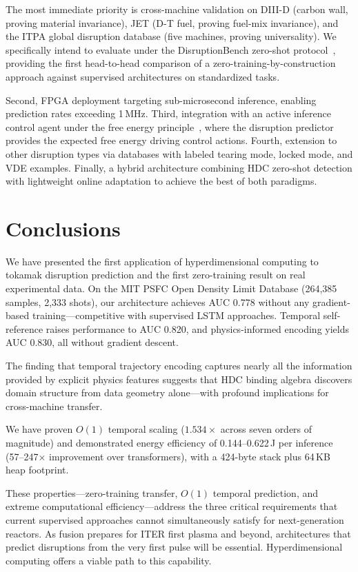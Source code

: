 \documentclass[twocolumn,prl,aps,superscriptaddress,floatfix]{revtex4-2}
\begin{document}
The most immediate priority is cross-machine validation on DIII-D (carbon wall, proving material invariance), JET (D-T fuel, proving fuel-mix invariance), and the ITPA global disruption database (five machines, proving universality). We specifically intend to evaluate under the DisruptionBench zero-shot protocol~\cite{Spangher2025}, providing the first head-to-head comparison of a zero-training-by-construction approach against supervised architectures on standardized tasks.

Second, FPGA deployment targeting sub-microsecond inference, enabling prediction rates exceeding 1\,MHz. Third, integration with an active inference control agent under the free energy principle~\cite{Friston2010}, where the disruption predictor provides the expected free energy driving control actions. Fourth, extension to other disruption types via databases with labeled tearing mode, locked mode, and VDE examples. Finally, a hybrid architecture combining HDC zero-shot detection with lightweight online adaptation to achieve the best of both paradigms.

\section{Conclusions}
\label{sec:conclusions}

We have presented the first application of hyperdimensional computing to tokamak disruption prediction and the first zero-training result on real experimental data. On the MIT PSFC Open Density Limit Database (264,385 samples, 2,333 shots), our architecture achieves AUC 0.778 without any gradient-based training---competitive with supervised LSTM approaches. Temporal self-reference raises performance to AUC 0.820, and physics-informed encoding yields AUC 0.830, all without gradient descent.

The finding that temporal trajectory encoding captures nearly all the information provided by explicit physics features suggests that HDC binding algebra discovers domain structure from data geometry alone---with profound implications for cross-machine transfer.

We have proven $O(1)$ temporal scaling ($1.534\times$ across seven orders of magnitude) and demonstrated energy efficiency of 0.144--0.622\,J per inference (57--247$\times$ improvement over transformers), with a 424-byte stack plus 64\,KB heap footprint.

These properties---zero-training transfer, $O(1)$ temporal prediction, and extreme computational efficiency---address the three critical requirements that current supervised approaches cannot simultaneously satisfy for next-generation reactors. As fusion prepares for ITER first plasma and beyond, architectures that predict disruptions from the very first pulse will be essential. Hyperdimensional computing offers a viable path to this capability.
\end{document}
